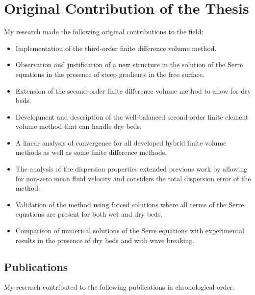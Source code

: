 \section{Original Contribution of the Thesis}
My research made the following original contributions to the field:
\begin{itemize}
	\item Implementation of the third-order finite difference volume method.
	\item Observation and justification of a new structure in the solution of the Serre equations in the presence of steep gradients in the free surface.
	\item Extension of the second-order finite difference volume method to allow for dry beds.
	\item Development and description of the well-balanced second-order finite element volume method that can handle dry beds.
	\item A linear analysis of convergence for all developed hybrid finite volume methods as well as some finite difference methods.
	\item The analysis of the dispersion properties extended previous work by allowing for non-zero mean fluid velocity and considers the total dispersion error of the method.
	\item Validation of the method using forced solutions where all terms of the Serre equations are present for both wet and dry beds.
	\item Comparison of numerical solutions of the Serre equations with experimental results in the presence of dry beds and with wave breaking. 
\end{itemize}

\subsection{Publications}
My research contributed to the following publications in chronological order.

